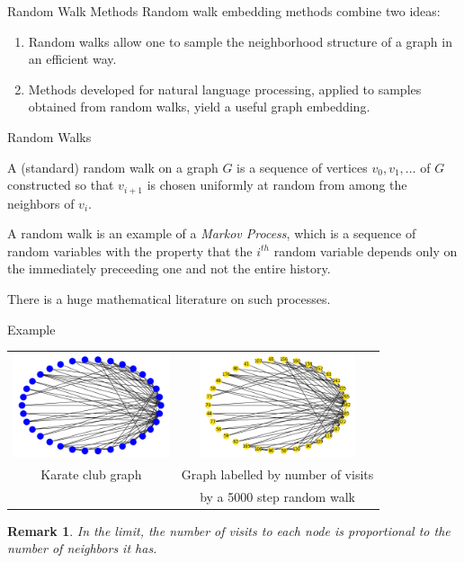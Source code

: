 \documentclass{beamer}
\newtheorem{remark}{Remark}
\begin{document}
\begin{frame}{Random Walk Methods}
  Random walk embedding methods combine two ideas:
  \begin{enumerate}
  \item Random walks allow one to sample the neighborhood structure of a graph in an efficient way.
  \item Methods developed for natural language processing, applied to samples obtained from random walks, yield a useful graph embedding.
  \end{enumerate}
\end{frame}
\begin{frame}{Random Walks}
  \begin{definition} A (standard) random walk on a graph $G$ is a sequence of vertices $v_0,v_1,\ldots$ of $G$
    constructed so that $v_{i+1}$ is chosen uniformly at random from among the neighbors of $v_{i}$.
  \end{definition}

  \bigskip\noindent
  A random walk is an example of a \textit{Markov Process}, which is a sequence of random variables with the property that the $i^{th}$ random variable depends only on the immediately preceeding one and not the entire history.

  \bigskip\noindent
  There is a huge mathematical literature on such processes.
\end{frame}
\begin{frame}{Example}
  \begin{tabular}{cc}
    \includegraphics[width=1.8in]{karate.png} &  \includegraphics[width=1.8in]{karate_walks.png}\\
    Karate club graph & Graph labelled by number of visits  \\
                                              &by a 5000 step random walk \\
  \end{tabular}
  \begin{remark} In the limit, the number of visits to each node is proportional to the number of neighbors it has.
  \end{remark}
\end{frame}
\end{document}
